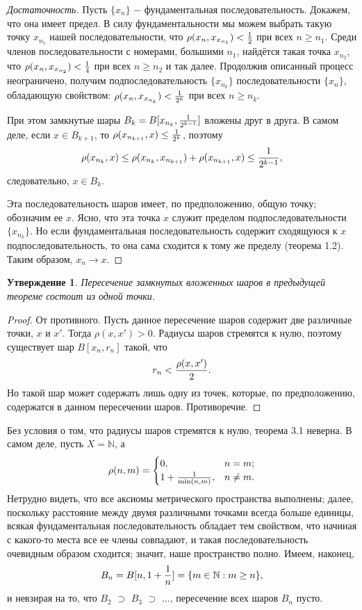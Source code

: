 \documentclass{article}
\newtheorem{claim}{Утверждение}[section]
\begin{document}
\begin{proof}[Достаточность]
Пусть \(\{x_n\}\) \(-\) фундаментальная последовательность. Докажем, что она имеет предел. В силу фундаментальности мы можем выбрать такую точку \(x_{n_1}\) нашей последовательности, что \(\rho(x_n, x_{x_{n_1}}) < {1 \over 2}\) при всех \(n \geq n_1\). Среди членов последовательности с номерами, большими \(n_1\), найдётся такая точка \(x_{n_2}\), что \(\rho(x_n, x_{x_{n_2}}) < {1 \over 4}\) при всех \(n \geq n_2\) и так далее. Продолжив описанный процесс неограничено, получим подпоследовательность \(\{x_{n_k}\}\) последовательности \(\{x_n\}\), обладающую свойством: \(\rho(x_n, x_{x_{n_k}}) < {1 \over {2 ^ k}}\) при всех \(n \geq n_k\).

При этом замкнутые шары \(B_k = B[x_{n_k}, {1 \over {2 ^ {k - 1}}}]\) вложены друг в друга. В самом деле, если \(x \in B_{k + 1}\), то \(\rho(x_{n_{k + 1}}, x) \leq {1 \over {2 ^ {k}}}\), поэтому
\[
\rho(x_{n_{k}}, x) \leq \rho(x_{n_{k}}, x_{n_{k + 1}}) + \rho(x_{n_{k + 1}}, x) \leq {1 \over {2 ^ {k - 1}}},
\]
следовательно, \(x \in B_k\).

Эта последовательность шаров имеет, по предположению, общую точку; обозначим ее \(x\). Ясно, что эта точка \(x\) служит пределом подпоследовательности \(\{x_{n_k}\}\). Но если фундаментальная последовательность содержит сходящуюся к \(x\) подпоследовательность, то она сама сходится к тому же пределу (теорема 1.2). Таким образом, \(x_n \to x\).
\end{proof}

\begin{claim}
Пересечение замкнутых вложенных шаров в предыдущей теореме состоит из одной точки.
\end{claim}

\begin{proof}
От противного. Пусть данное пересечение шаров содержит две различные точки, \(x\) и \(x'\). Тогда \(\rho(x, x') > 0\). Радиусы шаров стремятся к нулю, поэтому существует шар \(B[x_n, r_n]\) такой, что
\[
r_n < {\rho(x, x') \over 2}.
\]
Но такой шар может содержать лишь одну из точек, которые, по предположению, содержатся в данном пересечении шаров. Противоречие.
\end{proof}

Без условия о том, что радиусы шаров стремятся к нулю, теорема 3.1 неверна. В самом деле, пусть \(X = \mathbb{N}\), а
\[
\rho(n, m) =
\begin{cases}
0, & n = m; \\
1 + {1 \over \min(n, m)}, & n \neq m.
\end{cases}
\]
Нетрудно видеть, что все аксиомы метрического пространства выполнены; далее, поскольку расстояние между двумя различными точками всегда больше единицы, всякая фундаментальная последовательность обладает тем свойством, что начиная с какого-то места все ее члены совпадают, и такая последовательность очевидным образом сходится; значит, наше пространство полно. Имеем, наконец,
\[
B_n = B[n, 1 + {1 \over n}] = \{m \in \mathbb{N} : m \geq n\},
\]
и невзирая на то, что \(B_2\) \(\supset\) \(B_3\) \(\supset\) ..., пересечение всех шаров \(B_n\) пусто.
\end{document}
